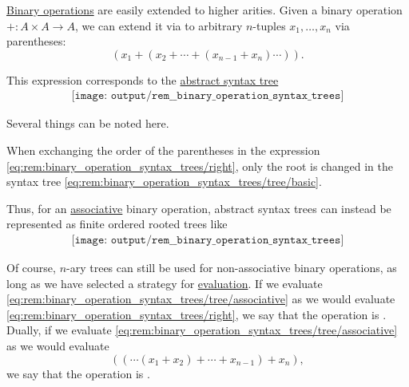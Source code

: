 \begin{remark}\label{rem:binary_operation_syntax_trees}
  \hyperref[def:binary_operation]{Binary operations} are easily extended to higher arities. Given a binary operation \( +: A \times A \to A \), we can extend it via  to arbitrary \( n \)-tuples \( x_1, \ldots, x_n \) via parentheses:
  \begin{equation}\label{eq:rem:binary_operation_syntax_trees/right}
    (x_1 + (x_2 + \cdots + (x_{n-1} + x_n) \cdots )).
  \end{equation}

  This expression corresponds to the \hyperref[con:abstract_syntax_tree]{abstract syntax tree}
  \begin{equation}\label{eq:rem:binary_operation_syntax_trees/tree/basic}
    \begin{aligned}
      \texttt{[image: output/rem\_\_binary\_operation\_syntax\_trees]}
    \end{aligned}
  \end{equation}

  Several things can be noted here.
  \begin{thmenum}
     When exchanging the order of the parentheses in the expression \eqref{eq:rem:binary_operation_syntax_trees/right}, only the root is changed in the syntax tree \eqref{eq:rem:binary_operation_syntax_trees/tree/basic}.

    Thus, for an \hyperref[def:binary_operation/associative]{associative} binary operation, abstract syntax trees can instead be represented as finite ordered rooted trees like
    \begin{equation}\label{eq:rem:binary_operation_syntax_trees/tree/associative}
      \begin{aligned}
        \texttt{[image: output/rem\_\_binary\_operation\_syntax\_trees]}
      \end{aligned}
    \end{equation}

    Of course, \( n \)-ary trees can still be used for non-associative binary operations, as long as we have selected a strategy for \hyperref[con:evaluation]{evaluation}. If we evaluate \eqref{eq:rem:binary_operation_syntax_trees/tree/associative} as we would evaluate \eqref{eq:rem:binary_operation_syntax_trees/right}, we say that the operation is . Dually, if we evaluate \eqref{eq:rem:binary_operation_syntax_trees/tree/associative} as we would evaluate
    \begin{equation}\label{eq:rem:binary_operation_syntax_trees/left}
      (( \cdots (x_1 + x_2) + \cdots + x_{n-1}) + x_n),
    \end{equation}
    we say that the operation is .


\end{thmenum}
\end{remark}
